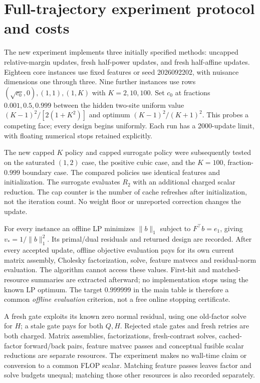 \documentclass[11pt]{article}
\begin{document}
\section{Full-trajectory experiment protocol and costs}
The new experiment implements three initially specified methods: uncapped relative-margin updates, fresh half-power updates, and fresh half-affine updates. Eighteen core instances use fixed features or seed 2026092202, with nuisance dimensions one through three. Nine further instances use rows $(\sqrt{c_0},0),(1,1),(1,K)$ with $K=2,10,100$. Set $c_0$ at fractions $0.001,0.5,0.999$ between the hidden two-site uniform value $(K-1)^2/[2(1+K^2)]$ and optimum $(K-1)^2/(K+1)^2$. This probes a competing face; every design begins uniformly. Each run has a 2000-update limit, with floating numerical stops retained explicitly.

The new capped $K$ policy and capped surrogate policy were subsequently tested on the saturated $(1,2)$ case, the positive cubic case, and the $K=100$, fraction-$0.999$ boundary case. The compared policies use identical features and initialization. The surrogate evaluates $R_2$ with an additional charged scalar reduction. The cap counter is the number of cache refreshes after initialization, not the iteration count. No weight floor or unreported correction changes the update.

For every instance an offline LP minimizes $\|b\|_1$ subject to $F^\top b=e_1$, giving $v_*=1/\|b\|_1^2$. Its primal/dual residuals and returned design are recorded. After every accepted update, offline objective evaluation pays for its own current matrix assembly, Cholesky factorization, solve, feature matvecs and residual-norm evaluation. The algorithm cannot access these values. First-hit and matched-resource summaries are extracted afterward; no implementation stops using the known LP optimum. The target $0.999999$ in the main table is therefore a common \emph{offline evaluation} criterion, not a free online stopping certificate.

A fresh gate exploits its known zero normal residual, using one old-factor solve for $H$; a stale gate pays for both $Q,H$. Rejected stale gates and fresh retries are both charged. Matrix assemblies, factorizations, fresh-contrast solves, cached-factor forward/back pairs, feature matvec passes and conceptual fusible scalar reductions are separate resources. The experiment makes no wall-time claim or conversion to a common FLOP scalar. Matching feature passes leaves factor and solve budgets unequal; matching those other resources is also recorded separately.
\end{document}
